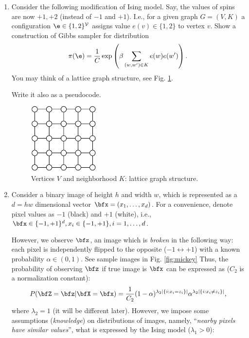 \documentclass[a4paper,12pt]{article}
\begin{document}
\begin{enumerate}
\item Consider the following modification of Ising model. Say, the values of spins 
are now $+1, +2$ (instead of $-1$ and $+1$). I.e., for a given graph $G=(V,K)$ a
configuration $\e\in\{1,2\}^\mathcal{V}$ assigns value $e(v)\in\{1,2\}$ to vertex $v$.
Show a construction of Gibbs sampler for distribution 
$$\pi(\e)={1\over C} \exp\left(\beta \sum_{(w,w')\in K} e(w)e(w')\right).$$
You may think of a lattice graph structure, see Fig. \ref{fig:graph}.\par
Write it also as a pseudocode.
  \begin{figure}[h!]
 \begin{center}
 \includegraphics[width=100pt]{pics/graph_ising.png}
 \caption{Vertices $V$ and neighborhood $K$: lattice graph structure.}\label{fig:graph}
 \end{center}
 \end{figure}

\newpage
\item Consider a binary image of height $h$ and width $w$, which is represented as a $d=hw$ dimensional
vector $\bfx=(x_1,\ldots,x_d)$. For a convenience, denote pixel values as $-1$ (black) and $+1$ (white), i.e.,
$\bfx\in\{-1,+1\}^d, x_i\in\{-1,+1\}, i=1,\ldots,d$.\par
However, we observe $\bfz$, an image which is  \textsl{broken} in the following way: each pixel is  independently flipped to the opposite
($-1 \leftrightarrow +1$) with a known probability $\alpha\in(0,1)$. See sample images in Fig. \ref{fig:mickey}
Thus, the probability of observing $\bfz$ if true image is $\bfx$ can be expressed as ($C_2$ is a normalization constant):
\begin{equation}
 P(\bfZ=\bfz| \bfX=\bfx)={1\over C_2}(1-\alpha)^{\lambda_2|\{i:x_i=z_i\}|}\alpha^{\lambda_2|\{i:x_i\neq z_i\}|},
\end{equation}
where $\lambda_2=1$ (it will be different later).
However, we impose some assumptions (\textsl{knowledge}) on distributions of images, namely, ``\textsl{nearby pixels
have similar values}'', what is expressed by the Ising model ($\lambda_1>0$):


\end{enumerate}
\end{document}
